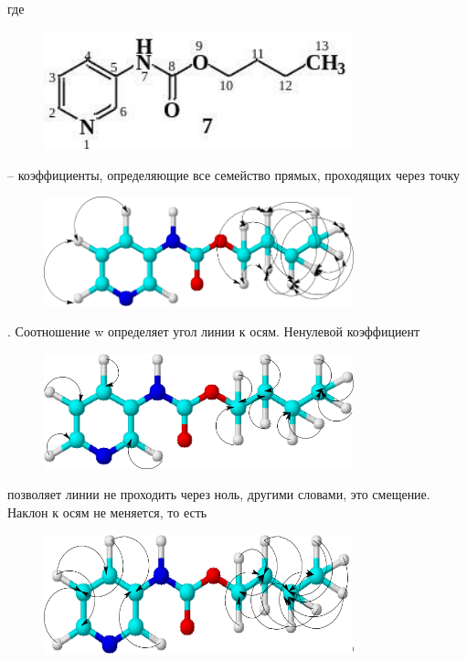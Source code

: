 где \begin{figure}[H]
	\centering
	\includegraphics[width=0.8\textwidth]{assets/6}
	\caption*{}
\end{figure}-- коэффициенты, определяющие все
семейство прямых, проходящих через точку
\begin{figure}[H]
	\centering
	\includegraphics[width=0.8\textwidth]{assets/7}
	\caption*{}
\end{figure}. Соотношение w определяет угол линии
к осям. Ненулевой коэффициент \begin{figure}[H]
	\centering
	\includegraphics[width=0.8\textwidth]{assets/8}
	\caption*{}
\end{figure}
позволяет линии не проходить через ноль, другими словами, это смещение.
Наклон к осям не меняется, то есть \begin{figure}[H]
	\centering
	\includegraphics[width=0.8\textwidth]{assets/9}
	\caption*{}
\end{figure}
